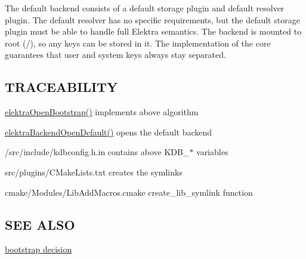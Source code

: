 The default backend consists of a default storage plugin and default resolver plugin. The default resolver has no specific requirements, but the default storage plugin must be able to handle full Elektra semantics. The backend is mounted to root ({\ttfamily /}), so any keys can be stored in it. The implementation of the core guarantees that user and system keys always stay separated.

\subsection*{T\+R\+A\+C\+E\+A\+B\+I\+L\+I\+T\+Y}


\begin{DoxyItemize}
\item \hyperlink{group__kdb_ga5bfaad0230457cd6386032fe65c41576}{elektra\+Open\+Bootstrap()} implements above algorithm
\item \hyperlink{backend_8c_a9ecb7fc73f33af5353756068d90e7862}{elektra\+Backend\+Open\+Default()} opens the default backend
\item /src/include/kdbconfig.h.\+in contains above K\+D\+B\+\_\+$\ast$ variables
\item src/plugins/\+C\+Make\+Lists.\+txt creates the symlinks
\item cmake/\+Modules/\+Lib\+Add\+Macros.\+cmake create\+\_\+lib\+\_\+symlink function
\end{DoxyItemize}

\subsection*{S\+E\+E A\+L\+S\+O}


\begin{DoxyItemize}
\item \hyperlink{doc_decisions_bootstrap_md}{bootstrap decision} 
\end{DoxyItemize}